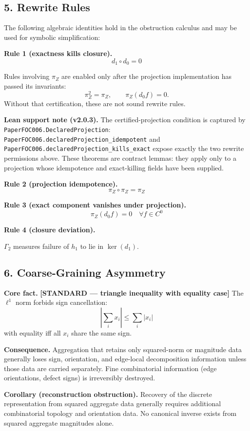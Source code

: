 \documentclass[
]{article}
\begin{document}
\subsection{5. Rewrite Rules}\label{rewrite-rules}

The following algebraic identities hold in the obstruction calculus and may be used for symbolic simplification:

\textbf{Rule 1 (exactness kills closure).}
\[
d_1 \circ d_0 = 0
\]

Rules involving \(\pi_Z\) are enabled only after the projection implementation has passed its invariants:
\[
\pi_Z^2=\pi_Z,\qquad \pi_Z(d_0f)=0.
\]
Without that certification, these are not sound rewrite rules.

\textbf{Lean support note (v2.0.3).} The certified-projection condition is captured by \texttt{PaperFOC006.DeclaredProjection}: \texttt{PaperFOC006.declaredProjection\_idempotent} and \texttt{PaperFOC006.declaredProjection\_kills\_exact} expose exactly the two rewrite permissions above. These theorems are contract lemmas: they apply only to a projection whose idempotence and exact-killing fields have been supplied.

\textbf{Rule 2 (projection idempotence).}
\[
\pi_Z \circ \pi_Z = \pi_Z
\]

\textbf{Rule 3 (exact component vanishes under projection).}
\[
\pi_Z(d_0 f) = 0 \quad \forall f \in C^0
\]

\textbf{Rule 4 (closure deviation).}

\(\Gamma_2\) measures failure of \(h_1\) to lie in \(\ker(d_1)\).

\subsection{6. Coarse-Graining Asymmetry}\label{coarse-graining-asymmetry}

\textbf{Core fact.} \textbf{{[}STANDARD --- triangle inequality with equality case{]}} The \(\ell^1\) norm forbids sign cancellation:
\[
\left|\sum_i x_i\right| \le \sum_i |x_i|
\]
with equality iff all \(x_i\) share the same sign.

\textbf{Consequence.} Aggregation that retains only squared-norm or magnitude data generally loses sign, orientation, and edge-local decomposition information unless those data are carried separately. Fine combinatorial information (edge orientations, defect signs) is irreversibly destroyed.

\textbf{Corollary (reconstruction obstruction).} Recovery of the discrete representation from squared aggregate data generally requires additional combinatorial topology and orientation data. No canonical inverse exists from squared aggregate magnitudes alone.
\end{document}
